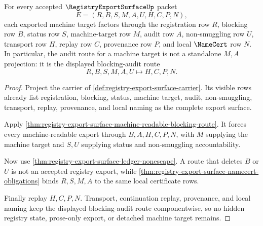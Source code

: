 \begin{theorem}
\label{thm:registry-export-surface-blocking-audit-factorization}
For every accepted $\RegistryExportSurfaceUp$ packet
$$
E=(R,B,S,M,A,U,H,C,P,N),
$$
each exported machine target factors through the registration row $R$, blocking row $B$, status row $S$, machine-target row $M$, audit row $A$, non-smuggling row $U$, transport row $H$, replay row $C$, provenance row $P$, and local $\NameCert$ row $N$. In particular, the audit route for a machine target is not a standalone $M,A$ projection: it is the displayed blocking-audit route
$$
R,B,S,M,A,U \longmapsto H,C,P,N .
$$
\end{theorem}
\begin{proof}
Project the carrier of \autoref{def:registry-export-surface-carrier}. Its visible rows already list registration, blocking, status, machine target, audit, non-smuggling, transport, replay, provenance, and local naming as the complete export surface.

Apply \autoref{thm:registry-export-surface-machine-readable-blocking-route}. It forces every machine-readable export through $B,A,H,C,P,N$, with $M$ supplying the machine target and $S,U$ supplying status and non-smuggling accountability.

Now use \autoref{thm:registry-export-surface-ledger-nonescape}. A route that deletes $B$ or $U$ is not an accepted registry export, while \autoref{thm:registry-export-surface-namecert-obligations} binds $R,S,M,A$ to the same local certificate rows.

Finally replay $H,C,P,N$. Transport, continuation replay, provenance, and local naming keep the displayed blocking-audit route componentwise, so no hidden registry state, prose-only export, or detached machine target remains.
\end{proof}

